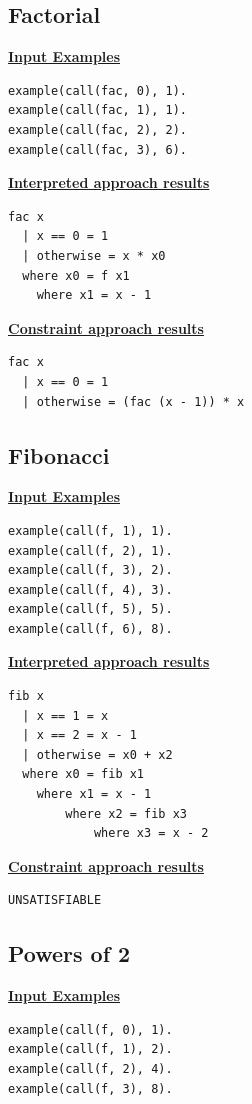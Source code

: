 \subsection{Factorial}
\underline{\textbf{Input Examples}}
\begin{lstlisting}
example(call(fac, 0), 1).
example(call(fac, 1), 1).
example(call(fac, 2), 2).
example(call(fac, 3), 6).
\end{lstlisting}

\begin{multicols}{2}

\underline{\textbf{Interpreted approach results}}
\begin{lstlisting}
fac x
  | x == 0 = 1
  | otherwise = x * x0
  where x0 = f x1
  	where x1 = x - 1
\end{lstlisting}
\columnbreak
\underline{\textbf{Constraint approach results}}
\begin{lstlisting}
fac x
  | x == 0 = 1
  | otherwise = (fac (x - 1)) * x
\end{lstlisting}
\end{multicols}

\subsection{Fibonacci}
\underline{\textbf{Input Examples}}
\begin{lstlisting}
example(call(f, 1), 1).
example(call(f, 2), 1).
example(call(f, 3), 2).
example(call(f, 4), 3).
example(call(f, 5), 5).
example(call(f, 6), 8).
\end{lstlisting}

\begin{multicols}{2}
\underline{\textbf{Interpreted approach results}}
\begin{lstlisting}
fib x
  | x == 1 = x
  | x == 2 = x - 1
  | otherwise = x0 + x2
  where x0 = fib x1
  	where x1 = x - 1
  		where x2 = fib x3
  			where x3 = x - 2
\end{lstlisting}
\columnbreak
\underline{\textbf{Constraint approach results}}
\begin{lstlisting}
UNSATISFIABLE
\end{lstlisting}
\end{multicols}

\pagebreak
\subsection{Powers of 2}
\underline{\textbf{Input Examples}}
\begin{lstlisting}
example(call(f, 0), 1).
example(call(f, 1), 2).
example(call(f, 2), 4).
example(call(f, 3), 8).
\end{lstlisting}

